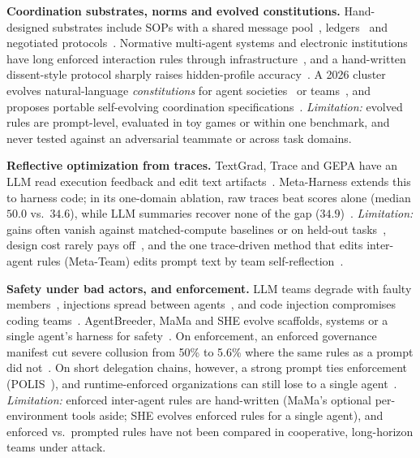 \documentclass{article}
\begin{document}
\textbf{Coordination substrates, norms and evolved constitutions.}
Hand-designed substrates include SOPs with a shared message pool~\citep{hong2024metagpt}, ledgers~\citep{fourney2024magentic} and negotiated protocols~\citep{marro2024scalable}.
Normative multi-agent systems and electronic institutions have long enforced interaction rules through infrastructure~\citep{esteva2001formal,boella2006introduction}, and a hand-written dissent-style protocol sharply raises hidden-profile accuracy~\citep{li2026systematic}.
A 2026 cluster evolves natural-language \emph{constitutions} for agent societies~\citep{kumar2026evolving,niranjani2026internal} or teams~\citep{hao2026evolve}, and proposes portable self-evolving coordination specifications~\citep{zhang2026swarm}.
\emph{Limitation:} evolved rules are prompt-level, evaluated in toy games or within one benchmark, and never tested against an adversarial teammate or across task domains.

\textbf{Reflective optimization from traces.}
TextGrad, Trace and GEPA have an LLM read execution feedback and edit text artifacts~\citep{yuksekgonul2025optimizing,cheng2024trace,agrawal2026gepa}.
Meta-Harness extends this to harness code; in its one-domain ablation, raw traces beat scores alone (median $50.0$ vs.\ $34.6$), while LLM summaries recover none of the gap ($34.9$)~\citep{lee2026metaharness}.
\emph{Limitation:} gains often vanish against matched-compute baselines or on held-out tasks~\citep{wang2026rethinking}, design cost rarely pays off~\citep{el2025inefficiencies}, and the one trace-driven method that edits inter-agent rules (Meta-Team) edits prompt text by team self-reflection~\citep{hao2026evolve}.

\textbf{Safety under bad actors, and enforcement.}
LLM teams degrade with faulty members~\citep{huang2025resilience}, injections spread between agents~\citep{lee2024prompt}, and code injection compromises coding teams~\citep{bowers2025analyzing}.
AgentBreeder, MaMa and SHE evolve scaffolds, systems or a single agent's harness for safety~\citep{rosser2025agentbreeder,nother2026mama,qu2026she}.
On enforcement, an enforced governance manifest cut severe collusion from 50\% to 5.6\% where the same rules as a prompt did not~\citep{bracalesyrnikov2026institutional}.
On short delegation chains, however, a strong prompt ties enforcement (POLIS~\citep{x2026multi}), and runtime-enforced organizations can still lose to a single agent~\citep{hsu2026opencollab}.
\emph{Limitation:} enforced inter-agent rules are hand-written (MaMa's optional per-environment tools aside; SHE evolves enforced rules for a single agent), and enforced vs.\ prompted rules have not been compared in cooperative, long-horizon teams under attack.
\end{document}
